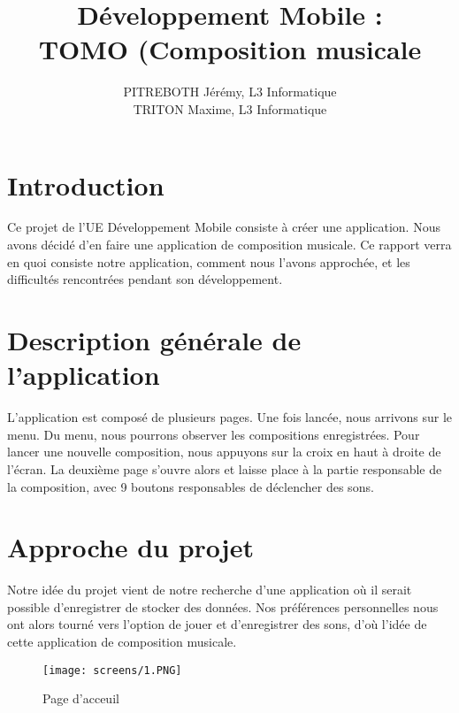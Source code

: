 \documentclass{article}
\title{Développement Mobile : \\ TOMO (Composition musicale}
\author{PITREBOTH Jérémy, L3 Informatique \\ TRITON Maxime, L3 Informatique}
\begin{document}
\maketitle %

\tableofcontents

\newpage

\section{Introduction}

\label{section:intro} %
 
Ce projet de l'UE Développement Mobile consiste à créer une application. Nous avons décidé d'en faire une application de composition musicale. Ce rapport verra en quoi consiste notre application, comment nous l'avons approchée, et les difficultés rencontrées pendant son développement. 


\section{Description générale de l'application}
L'application est composé de plusieurs pages. Une fois lancée, nous arrivons sur le menu. Du menu, nous pourrons observer les compositions enregistrées. Pour lancer une nouvelle composition, nous appuyons sur la croix en haut à droite de l'écran. La deuxième page s'ouvre alors et laisse place à la partie responsable de la composition, avec 9 boutons responsables de déclencher des sons.

\section{Approche du projet}
Notre idée du projet vient de notre recherche d'une application où il serait possible d'enregistrer de stocker des données. Nos préférences personnelles nous ont alors tourné vers l'option de jouer et d'enregistrer des sons, d'où l'idée de cette application de composition musicale. \\
\begin{figure}[H]
    \centering
    \begin{minipage}[c]{.3\linewidth}
        \centering
        \texttt{[image: screens/1.PNG]}
        \caption{Page d'acceuil}
    \end{minipage}
\end{figure}

\newpage
\end{document}
